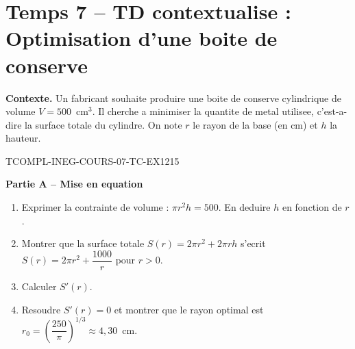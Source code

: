 

\section*{Temps 7 -- TD contextualise : Optimisation d'une boite de conserve}

\textbf{Contexte.} Un fabricant souhaite produire une boite de conserve cylindrique de volume $V = 500$~cm$^3$. Il cherche a minimiser la quantite de metal utilisee, c'est-a-dire la surface totale du cylindre. On note $r$ le rayon de la base (en cm) et $h$ la hauteur.

\bigskip


\begin{exercice}{TCOMPL-INEG-COURS-07-TC-EX1}{2}{15}

\textbf{Partie A -- Mise en equation}

\begin{enumerate}
  \item Exprimer la contrainte de volume : $\pi r^2 h = 500$. En deduire $h$ en fonction de $r$.
  \item Montrer que la surface totale $S(r) = 2\pi r^2 + 2\pi r h$ s'ecrit $S(r) = 2\pi r^2 + \dfrac{1000}{r}$ pour $r > 0$.
  \item Calculer $S'(r)$.
  \item Resoudre $S'(r) = 0$ et montrer que le rayon optimal est $r_0 = \left(\dfrac{250}{\pi}\right)^{1/3} \approx 4{,}30$~cm.
\end{enumerate}

\end{exercice}

